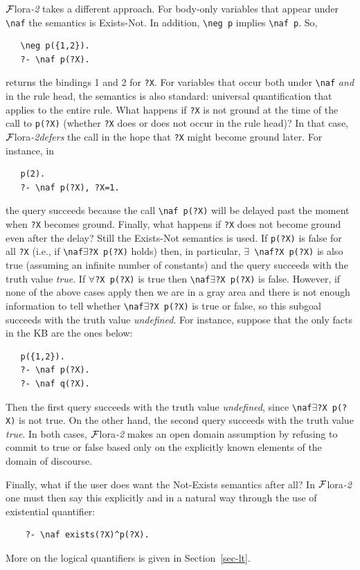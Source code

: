 \documentclass[11pt]{article}
\newcommand{\FLORA}{{\mbox{\sc ${\cal F}${lora}\rm\emph{-2}}}\xspace}
\newcommand{\FLSYSTEM}{\FLORA}
\newcommand{\bs}{\textbackslash}
\newcommand{\RULELOGNAF}{{\texttt{{\bs}naf}}\xspace}
\newcommand{\RULELOGNEG}{{\texttt{{\bs}neg}}\xspace}
\begin{document}
\FLSYSTEM takes a different approach. For body-only variables that appear
under \texttt{\RULELOGNAF} the semantics is Exists-Not. In addition, \texttt{\RULELOGNEG p}
implies \texttt{\RULELOGNAF p}. So,
\begin{verbatim}
   \neg p({1,2}).
   ?- \naf p(?X).
\end{verbatim}
returns the bindings 1 and 2 for \texttt{?X}. For variables that occur both
under \texttt{\RULELOGNAF} \emph{and} in the rule head, the semantics is also standard:
universal quantification that applies to the entire rule.
What happens if \texttt{?X} is not ground at the time of the call to
\texttt{p(?X)} (whether \texttt{?X} does or does not occur in the rule head)?
In that case, \FLSYSTEM \emph{defers} the call in the hope that \texttt{?X}
might become ground later. For instance, in
\begin{verbatim}
   p(2).
   ?- \naf p(?X), ?X=1.
\end{verbatim}
the query succeeds because the call \texttt{\RULELOGNAF p(?X)} will be delayed past
the moment when \texttt{?X} becomes ground.   
Finally, what happens if \texttt{?X} does not become ground even after the
delay? Still the Exists-Not semantics is used. If \texttt{p(?X)} is false
for all \texttt{?X} (i.e., if \texttt{\RULELOGNAF $\exists$?X p(?X)} holds) then, in
particular, \texttt{$\exists$ \RULELOGNAF ?X p(?X)} is also true (assuming an
infinite number of constants) and the query
succeeds with the truth value \emph{true}.
If \texttt{$\forall$?X p(?X)} is true then \texttt{\RULELOGNAF $\exists$?X
  p(?X)}  is false.  
However, if none of the above cases apply then we are in a gray area
and there is not enough information to tell whether
\texttt{\RULELOGNAF $\exists$?X p(?X)} is true or false, so this subgoal
succeeds with the truth
value \emph{undefined}. For instance, suppose that the only facts in the KB
are the ones below:
\begin{verbatim}
   p({1,2}).
   ?- \naf p(?X).
   ?- \naf q(?X).
\end{verbatim}
Then the first query succeeds with the truth value \emph{undefined}, since
\texttt{\RULELOGNAF $\exists$?X p(?X)} is not true. On the other hand, the second
query succeeds with the truth value \emph{true}. 
In both cases, \FLSYSTEM makes an open domain assumption by refusing to commit
to true or false based only on the explicitly known elements of the domain
of discourse.

Finally, what if the user does want the Not-Exists semantics after all?
In \FLSYSTEM one must then say this explicitly and in a natural way through
the use of existential quantifier:
\begin{verbatim}
    ?- \naf exists(?X)^p(?X).
\end{verbatim}
More on the logical quantifiers is given in Section~\ref{sec-lt}.
\end{document}
